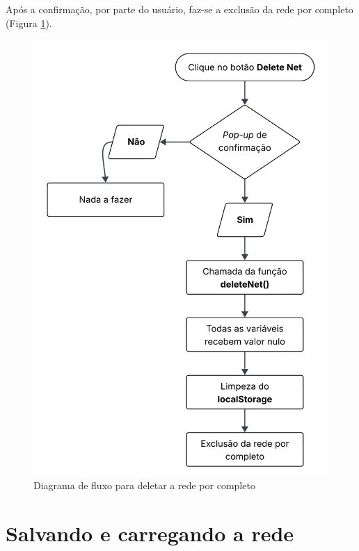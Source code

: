 \documentclass[
	12pt,				%
	openright,			%
	oneside,			%
	a4paper,			%
	english,			%
	brazil				%
	]{abntex2}
\theoremstyle{doispontos}
\begin{document}


Após a confirmação, por parte do usuário, faz-se a exclusão da rede por completo (Figura \ref{fig:deleteNetDiagram}).

\begin{figure}[ht] 
	\centering
	\includegraphics[scale=0.2]{figuras/diagrama-fluxo-deleteNet.png}
	\caption[Diagrama de fluxo para deletar a rede por completo]{Diagrama de fluxo para deletar a rede por completo}
	\label{fig:deleteNetDiagram}
\end{figure}
\FloatBarrier

\section{Salvando e carregando a rede}\label{cap:saveLoadNet}
\end{document}
